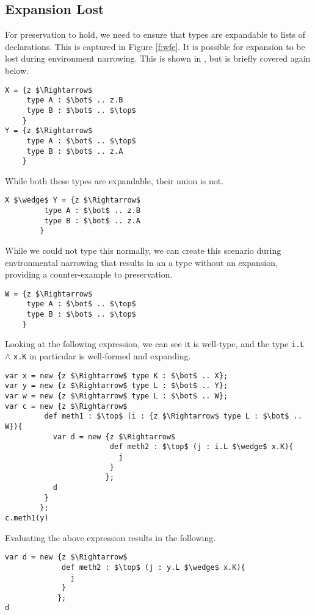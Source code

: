 \documentclass{llncs}
\begin{document}
\subsection{Expansion Lost}
For preservation to hold, we need to ensure that types are expandable 
to lists of declarations. This is captured in Figure \ref{f:wfe}. It is 
possible for expansion to be lost during environment narrowing. This is 
shown in \cite{Amin:2012}, but is briefly covered again below.
\begin{lstlisting}[mathescape, style=custom_lang]
X = {z $\Rightarrow$
     type A : $\bot$ .. z.B
     type B : $\bot$ .. $\top$
    }
Y = {z $\Rightarrow$
     type A : $\bot$ .. $\top$
     type B : $\bot$ .. z.A
    }
\end{lstlisting}
While both these types are expandable, their union is not.
\begin{lstlisting}[mathescape, style=custom_lang]
X $\wedge$ Y = {z $\Rightarrow$
         type A : $\bot$ .. z.B
         type B : $\bot$ .. z.A
        }
\end{lstlisting}
While we could not type this normally, we can create this 
scenario during environmental narrowing that results in 
an a type without an expansion, providing a counter-example 
to preservation.
\begin{lstlisting}[mathescape, style=custom_lang]
W = {z $\Rightarrow$
     type A : $\bot$ .. $\top$
     type B : $\bot$ .. $\top$
    }
\end{lstlisting}
Looking at the following expression, we can see it is well-type, 
and the type \texttt{i.L} $\wedge$ \texttt{x.K} in particular is 
well-formed and expanding.
\begin{lstlisting}[mathescape, style=custom_lang]
var x = new {z $\Rightarrow$ type K : $\bot$ .. X};
var y = new {z $\Rightarrow$ type L : $\bot$ .. Y};
var w = new {z $\Rightarrow$ type L : $\bot$ .. W};
var c = new {z $\Rightarrow$
         def meth1 : $\top$ (i : {z $\Rightarrow$ type L : $\bot$ .. W}){
           var d = new {z $\Rightarrow$
                        def meth2 : $\top$ (j : i.L $\wedge$ x.K){
                          j
                        }
                       };
           d
         }
        };
c.meth1(y)
\end{lstlisting}
Evaluating the above expression results in the following.
\begin{lstlisting}[mathescape, style=custom_lang]
var d = new {z $\Rightarrow$
             def meth2 : $\top$ (j : y.L $\wedge$ x.K){
               j
             }
            };
d
\end{lstlisting}
\end{document}
